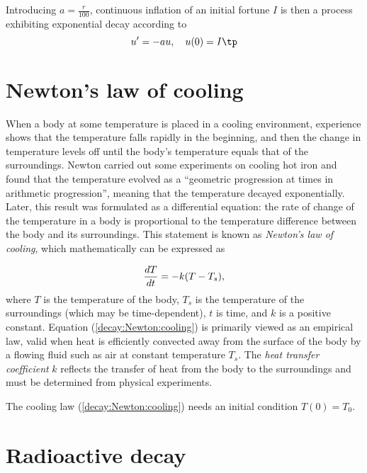 \documentclass[graybox,sectrefs,envcountresetchap,open=right,final]{svmonodo}
\begin{document}
Introducing $a=\frac{r}{100}$, continuous inflation of an initial
fortune $I$ is then
a process exhibiting exponential decay according to
\[ u^{\prime} = -au,\quad u(0)=I\tp  \]

\section{Newton's law of cooling}
\label{decay:app:Newton:cooling}


When a body at some temperature is placed in a cooling environment,
experience shows that the temperature falls rapidly in the beginning,
and then the change in temperature levels off until the body's
temperature equals that of the surroundings. Newton carried out some
experiments on cooling hot iron and found that the temperature
evolved as a ``geometric progression at times in arithmetic progression'',
meaning that the temperature decayed exponentially.
Later, this result was formulated as a differential equation:
the rate of change of the temperature in a body is proportional to
the temperature difference between the body and its surroundings.
This statement is known as \emph{Newton's law of cooling}, which
mathematically can be expressed as

\begin{equation}
{dT\over dt} = -k(T-T_s),
\label{decay:Newton:cooling}
\end{equation}
where $T$ is the temperature of the body, $T_s$ is the temperature
of the surroundings (which may be time-dependent),
$t$ is time, and $k$ is a positive constant.
Equation (\ref{decay:Newton:cooling}) is primarily viewed as an
empirical law, valid when heat is efficiently convected away
from the surface of the body by a flowing fluid such as air
at constant temperature $T_s$.
The \emph{heat transfer coefficient} $k$ reflects the transfer of
heat from the body to
the surroundings and must be determined from physical experiments.

The cooling law (\ref{decay:Newton:cooling}) needs an initial
condition $T(0)=T_0$.


\section{Radioactive decay}
\label{decay:app:nuclear}
\end{document}
